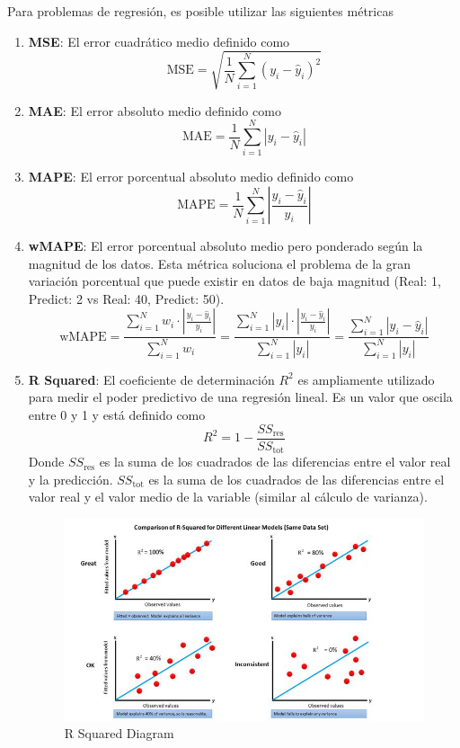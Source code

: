 Para problemas de regresión, es posible utilizar las siguientes métricas 
\begin{enumerate}
    \item \textbf{MSE}: El error cuadrático medio definido como 
    $$ 
    \text{MSE} = \sqrt{\frac{1}{N}\sum_{i=1}^N(y_i - \hat{y}_i)^2}
    $$
    \item \textbf{MAE}: El error absoluto medio definido como 
    $$ 
    \text{MAE} = \frac{1}{N}\sum_{i=1}^N|y_i - \hat{y}_i|
    $$
    \item \textbf{MAPE}: El error porcentual absoluto medio definido como 
    $$ 
    \text{MAPE} = \frac{1}{N}\sum_{i=1}^N \left | \frac{y_i - \hat{y}_i}{y_i} \right |
    $$
    \item \textbf{wMAPE}: El error porcentual absoluto medio pero ponderado según la magnitud de los datos. Esta métrica soluciona el problema de la gran variación porcentual que puede existir en datos de baja magnitud (Real: 1, Predict: 2 vs Real: 40, Predict: 50). 
    $$ 
    \text{wMAPE} = \frac{\sum_{i=1}^N w_i \cdot \left | \frac{y_i - \hat{y}_i}{y_i} \right |}{\sum_{i=1}^N w_i} = \frac{\sum_{i=1}^N |y_i| \cdot \left | \frac{y_i - \hat{y}_i}{y_i} \right |}{\sum_{i=1}^N |y_i|} =  \frac{\sum_{i=1}^N  \left | y_i - \hat{y}_i\right |}{\sum_{i=1}^N |y_i|}
    $$
    
    \item \textbf{R Squared}: El coeficiente de determinación $R^2$ es ampliamente utilizado para medir el poder predictivo de una regresión lineal. Es un valor que oscila entre 0 y 1 y está definido como 
    $$ 
    R^2 = 1 - \frac{SS_{\text{res}}}{SS_{\text{tot}}}
    $$
    Donde $SS_{\text{res}}$ es la suma de los cuadrados de las diferencias entre el valor real y la predicción. $SS_{\text{tot}}$ es la suma de los cuadrados de las diferencias entre el valor real y el valor medio de la variable (similar al cálculo de varianza). 

    \begin{figure}[H]
    \center
    \includegraphics[scale=0.1]{notebooks/Basic/img/r_squared_diagram.png}
    \caption{R Squared Diagram}
    \end{figure}


\end{enumerate}
